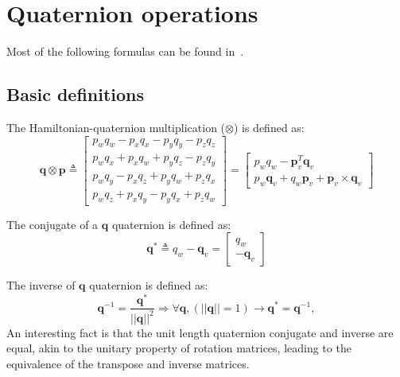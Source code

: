 \appendix
\chapter{Quaternion operations}\label{app:quaternion}

Most of the following formulas can be found in~\cite{quaternion-eskf}. 

\section{Basic definitions}

The Hamiltonian-quaternion multiplication ($\otimes$) is defined as:
\begin{equation}
    \mathbf{q}\otimes\mathbf{p}\triangleq
    \begin{bmatrix}
        p_wq_w-p_xq_x-p_yq_y-p_zq_z \\
        p_wq_x+p_xq_w+p_yq_z-p_zq_y \\
        p_wq_y-p_xq_z+p_yq_w+p_zq_x \\
        p_wq_z+p_xq_y-p_yq_x+p_zq_w
    \end{bmatrix}=\begin{bmatrix}
        p_wq_w-\mathbf{p}_v^T\mathbf{q}_v \\
        p_w\mathbf{q}_v+q_w\mathbf{p}_v+\mathbf{p}_v\times\mathbf{q}_v
    \end{bmatrix}
    \label{eq:quaternion-product}
\end{equation}

The conjugate of a $\mathbf{q}$ quaternion is defined as:
\begin{equation}
    \mathbf{q}^*\triangleq q_w-\mathbf{q}_v=\begin{bmatrix}
        q_w \\ -\mathbf{q}_v
    \end{bmatrix}
\end{equation}

The inverse of $\mathbf{q}$ quaternion is defined as:
\begin{equation}
    \mathbf{q}^{-1}=\frac{\mathbf{q}^*}{||\mathbf{q}||^2}\Rightarrow\forall\mathbf{q},(||\mathbf{q}||=1)\rightarrow\mathbf{q}^*=\mathbf{q}^{-1},
\end{equation}
An interesting fact is that the unit length quaternion conjugate and inverse are equal, akin to the unitary property of rotation matrices, leading to the equivalence of the transpose and inverse matrices.

